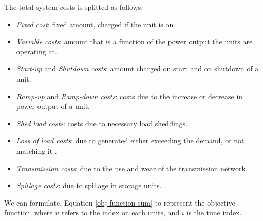 The total system costs is splitted as follows:
\begin{itemize}
    \item \textit{Fixed cost}: fixed amount, charged if the unit is on.
    \item \textit{Variable costs}: amount that is a function of the power output the units are operating at.
    \item \textit{Start-up} and \textit{Shutdown costs}: amount charged on start and on shutdown of a unit.
    \item \textit{Ramp-up} and \textit{Ramp-down costs}: costs due to the increase or decrease in power output of a unit.
    \item \textit{Shed load costs}: costs due to necessary load sheddings.
    \item \textit{Loss of load costs}: due to generated either exceeding the demand, or not matching it .
    \item \textit{Transmission costs}: due to the use and wear of the transmission network.
    \item \textit{Spillage costs}: due to spillage in storage units.
\end{itemize}

We can formulate, Equation \ref{obj-function-sum} to represent the objective function, where $u$ refers to the index on each units, and $i$ is the time index.

